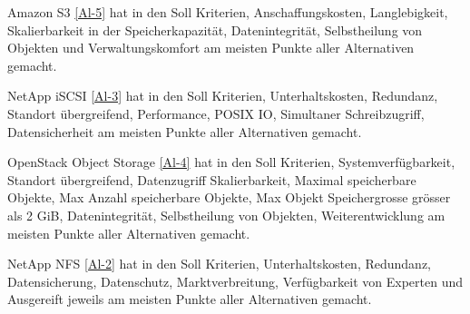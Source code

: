 Amazon S3 \ref{Al-5} hat in den Soll Kriterien, Anschaffungskosten, Langlebigkeit, Skalierbarkeit in der Speicherkapazität, Datenintegrität, Selbstheilung von Objekten und Verwaltungskomfort am meisten Punkte aller Alternativen gemacht.

NetApp iSCSI \ref{Al-3} hat in den Soll Kriterien, Unterhaltskosten, Redundanz,  Standort übergreifend, Performance, POSIX IO, Simultaner Schreibzugriff, Datensicherheit am meisten Punkte aller Alternativen gemacht.

OpenStack Object Storage \ref{Al-4} hat in den Soll Kriterien, Systemverfügbarkeit, Standort übergreifend, Datenzugriff Skalierbarkeit, Maximal speicherbare Objekte, Max Anzahl speicherbare Objekte, Max Objekt Speichergrosse grösser als 2 GiB, Datenintegrität, Selbstheilung von Objekten, Weiterentwicklung am meisten Punkte aller Alternativen gemacht.

NetApp NFS \ref{Al-2} hat in den Soll Kriterien, Unterhaltskosten, Redundanz, Datensicherung,  Datenschutz, Marktverbreitung, Verfügbarkeit von Experten und Ausgereift jeweils am meisten Punkte aller Alternativen gemacht.








